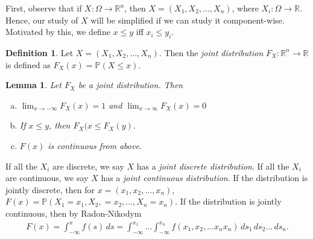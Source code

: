 \documentclass[12pt]{article}
\newcommand{\rr}{\mathbb{R}}
\newcommand{\prob}{\mathbb{P}}
\theoremstyle{plain}
\newtheorem{lemma}[theorem]{Lemma}
\theoremstyle{definition}
\newtheorem*{definition}{Definition}
\theoremstyle{remark}
\numberwithin{equation}{section}  %
\begin{document}
First, observe that if ${X}: \Omega \to \rr^n$, then $X = (X_1, X_2,
\ldots, X_n)$, where $X_i: \Omega \to \rr$. Hence, our study of $X$ will be
simplified if we can study it component-wise. Motivated by this, we define
$x \le y$ iff $x_i \le y_i$. 
\begin{definition}
Let ${X} = (X_1, X_2, \ldots, X_n)$. Then the \emph{joint distribution}
$F_X: \rr^n \to \rr$
is defined as $F_X(x) = \prob({X} \le x)$.
\begin{lemma}
Let $F_X$ be a joint distribution. Then
\begin{enumerate}[a)]
\item
$\lim_{x \to -\infty} F_X(x) = 1$ and $\lim_{x \to \infty}
F_X(x) = 0$
\item
If $x \le y$, then $F_X(x \le F_X(y)$.
\item
$F(x)$ is continuous from above.
\end{enumerate}
\end{lemma}
If all the $X_i$ are discrete, we say $X$ has a \emph{joint discrete
distribution}. If all the $X_i$ are continuous, we say $X$ has a 
\emph{joint continuous distribution}. If the distribution is jointly discrete,
then for $x = (x_1, x_2, \ldots, x_n)$,
 $F(x) = \prob(X_1 = x_1, X_2, = x_2,
\ldots, X_n = x_n)$. If the distribution is jointly continuous, then by
Radon-Nikodym
\begin{align*}
F(x) = \int_{-\infty}^x f(s) \, ds = \int_{-\infty}^{x_1} \ldots
\int_{-\infty}^{x_n} f(x_1, x_2, \ldots x_nx_n) \, ds_1 \, ds_2 \ldots \, ds_n.
\end{align*}

\end{definition}
\end{document}
